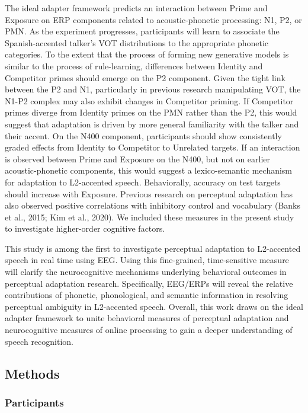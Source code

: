 \documentclass[
  12pt,
  twoside]{article}
\begin{document}
The ideal adapter framework predicts an interaction between Prime and Exposure on ERP components related to acoustic-phonetic processing: N1, P2, or PMN.
As the experiment progresses, participants will learn to associate the Spanish-accented talker's VOT distributions to the appropriate phonetic categories.
To the extent that the process of forming new generative models is similar to the process of rule-learning, differences between Identity and Competitor primes should emerge on the P2 component.
Given the tight link between the P2 and N1, particularly in previous research manipulating VOT, the N1-P2 complex may also exhibit changes in Competitor priming.
If Competitor primes diverge from Identity primes on the PMN rather than the P2, this would suggest that adaptation is driven by more general familiarity with the talker and their accent.
On the N400 component, participants should show consistently graded effects from Identity to Competitor to Unrelated targets.
If an interaction is observed between Prime and Exposure on the N400, but not on earlier acoustic-phonetic components, this would suggest a lexico-semantic mechanism for adaptation to L2-accented speech.
Behaviorally, accuracy on test targets should increase with Exposure.
Previous research on perceptual adaptation has also observed positive correlations with inhibitory control and vocabulary (Banks et al., 2015; Kim et al., 2020).
We included these measures in the present study to investigate higher-order cognitive factors.

This study is among the first to investigate perceptual adaptation to L2-accented speech in real time using EEG.
Using this fine-grained, time-sensitive measure will clarify the neurocognitive mechanisms underlying behavioral outcomes in perceptual adaptation research.
Specifically, EEG/ERPs will reveal the relative contributions of phonetic, phonological, and semantic information in resolving perceptual ambiguity in L2-accented speech.
Overall, this work draws on the ideal adapter framework to unite behavioral measures of perceptual adaptation and neurocognitive measures of online processing to gain a deeper understanding of speech recognition.

\hypertarget{methods-3}{%
\subsection{Methods}\label{methods-3}}

\hypertarget{participants}{%
\subsubsection{Participants}\label{participants}}
\end{document}
